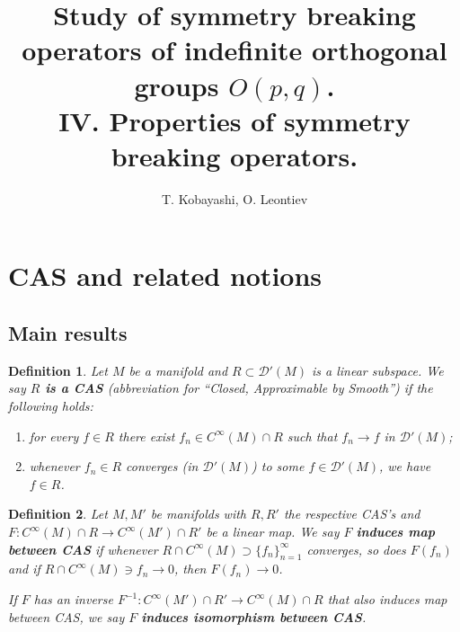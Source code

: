 \documentclass{article}
\newcommand{\tmtextbf}[1]{{\bfseries{#1}}}
\newcommand{\tmtextit}[1]{{\itshape{#1}}}
\newtheorem{definition}{Definition}
\begin{document}
\title{Study of symmetry breaking operators of indefinite orthogonal groups $O( p, q)$.\\ 
IV. Properties of symmetry breaking operators.}
\author{T. Kobayashi, O. Leontiev}
\maketitle
{\tableofcontents}
\setcounter{section}{24}
\section{CAS and related notions}\label{sec:CAS}

\subsection{Main results}

\begin{definition}
  \label{CAS:def-CAS}Let $M$ be a manifold and $R \subset \mathcal{D}' (M)$ is
  a linear subspace. We say \tmtextbf{$R$ is a CAS} (abbreviation for
  ``Closed, Approximable by Smooth'') if the following holds:
  \begin{enumerate}
    \item for every $f \in R$ there exist $f_n \in C^{\infty} (M) \cap R$ such
    that $f_n \rightarrow f$ in $\mathcal{D}' (M)$;
    
    \item whenever $f_n \in R$ converges (in $\mathcal{D}' (M)$) to some $f
    \in \mathcal{D}' (M)$, we have $f \in R$.
  \end{enumerate}
\end{definition}

\begin{definition}
  \label{CAS:def-map}Let $M, M'$ be manifolds with $R, R'$ the respective
  CAS's and $F : C^{\infty} (M) \cap R \rightarrow C^{\infty} (M') \cap R'$ be
  a linear map. We say $F$ \tmtextbf{induces map between CAS} if whenever $R
  \cap C^{\infty} (M) \supset \{ f_n \}_{n = 1}^{\infty}$ converges, so does
  $F (f_n)$ and if $R \cap C^{\infty} (M) \ni f_n \rightarrow 0$, then $F
  (f_n) \rightarrow 0$.
  
  If $F$ has an inverse $F^{- 1} : C^{\infty} (M') \cap R' \rightarrow
  C^{\infty} (M) \cap R$ that also induces map between CAS, we say $F$
  \tmtextbf{\tmtextit{induces isomorphism between CAS}}.
\end{definition}
\end{document}
